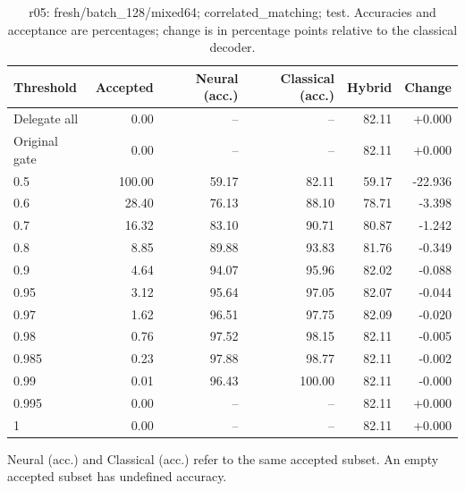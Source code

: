 \begin{table}[htbp]
\centering\small
\setlength{\tabcolsep}{3pt}
\caption{r05: fresh/batch\_128/mixed64; correlated\_matching; test. Accuracies and acceptance are percentages; change is in percentage points relative to the classical decoder.}
\begin{tabular}{lrrrrr}
\toprule
Threshold & Accepted & Neural (acc.) & Classical (acc.) & Hybrid & Change \\
\midrule
Delegate all & 0.00 & -- & -- & 82.11 & +0.000 \\
Original gate & 0.00 & -- & -- & 82.11 & +0.000 \\
0.5 & 100.00 & 59.17 & 82.11 & 59.17 & -22.936 \\
0.6 & 28.40 & 76.13 & 88.10 & 78.71 & -3.398 \\
0.7 & 16.32 & 83.10 & 90.71 & 80.87 & -1.242 \\
0.8 & 8.85 & 89.88 & 93.83 & 81.76 & -0.349 \\
0.9 & 4.64 & 94.07 & 95.96 & 82.02 & -0.088 \\
0.95 & 3.12 & 95.64 & 97.05 & 82.07 & -0.044 \\
0.97 & 1.62 & 96.51 & 97.75 & 82.09 & -0.020 \\
0.98 & 0.76 & 97.52 & 98.15 & 82.11 & -0.005 \\
0.985 & 0.23 & 97.88 & 98.77 & 82.11 & -0.002 \\
0.99 & 0.01 & 96.43 & 100.00 & 82.11 & -0.000 \\
0.995 & 0.00 & -- & -- & 82.11 & +0.000 \\
1 & 0.00 & -- & -- & 82.11 & +0.000 \\
\bottomrule
\end{tabular}
\par\smallskip\footnotesize Neural (acc.) and Classical (acc.) refer to the same accepted subset. An empty accepted subset has undefined accuracy.
\end{table}
